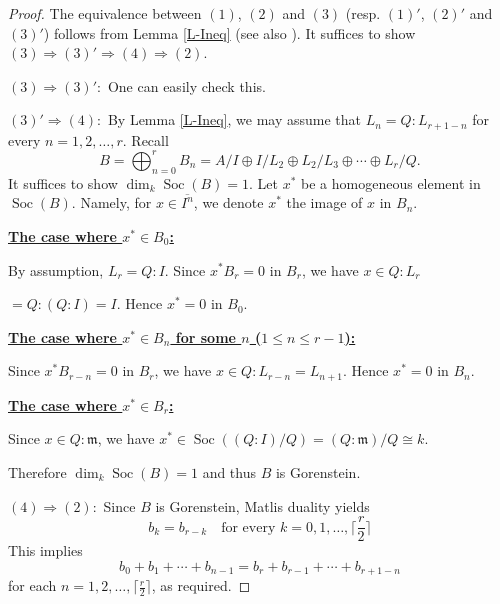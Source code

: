 \documentclass[12pt]{amsart}
\theoremstyle{definition}
\theoremstyle{remark}
\numberwithin{equation}{section}
\DeclareMathOperator{\Soc}{Soc}
\newcommand{\m}{\mathfrak m}
\renewcommand{\:}{\colon}
\begin{document}
\begin{proof}
The equivalence between $(1)$, $(2)$ and $(3)$ (resp. $(1)'$, $(2)'$ and $(3)'$) follows from Lemma \ref{L-Ineq} (see also \cite[Theorem 4.3]{HKU}).
It suffices to show $(3) \Rightarrow (3)' \Rightarrow (4)  \Rightarrow (2)$. 
  
\par \vspace{2mm} \par \noindent 
$(3) \Longrightarrow (3)':$ 
One can easily check this. 
\par \vspace{2mm} \par \noindent 
$(3)' \Longrightarrow (4):$ 
By Lemma \ref{L-Ineq}, we may assume that 
$L_n=Q:L_{r+1-n}$ for every $n=1,2,\ldots, r$.  
Recall 
\[
B=\bigoplus_{n=0}^r B_n=A/I\oplus I/L_2\oplus L_2/L_3 \oplus 
\cdots \oplus L_r/Q. 
\]
It suffices to show $\dim_k \Soc(B)=1$.  
Let $x^{*}$ be a homogeneous element  in $\Soc(B)$. 
Namely, for $x \in \overline{I^n}$, we denote $x^{*}$ 
the image of $x$ in $B_n$. 
\par \vspace{1mm} \par \noindent
\underline{\bf The case where $x^{*} \in B_0$:}
\par \vspace{1mm}
By assumption, $L_r=Q:I$. 
Since $x^{*} B_r =0$ in $B_r$, we have
$x \in Q \colon L_r$\par\noindent
$=Q \colon (Q:I)=I$. 
Hence $x^{*}=0$ in $B_0$. 
\par \vspace{1mm} \par \noindent
\underline{\bf The case where $x^{*} \in B_n$ 
for some $n$ ($1 \le n \le r-1$):}
\par \vspace{1mm}
Since $x^{*}B_{r-n}=0$ in $B_r$, we have 
$x \in Q \colon  L_{r-n}=L_{n+1}$. 
Hence $x^{*}=0$ in $B_n$. 
\par \vspace{1mm} \par \noindent
\underline{\bf The case where $x^{*} \in B_r$:}
\par \vspace{1mm}
Since $x \in Q:\m$, we have $x^{*} \in \Soc((Q:I)/Q) 
=(Q\colon \m)/Q\cong k$. 
\par \vspace{1mm}\par \noindent
Therefore $\dim_k \Soc(B)=1$ and thus $B$ is Gorenstein. 

\par \vspace{2mm} \par \noindent 
$(4) \Longrightarrow (2):$ 
Since $B$ is Gorenstein, Matlis duality yields 
\[
b_k = b_{r-k} \quad \text{for every $k=0,1,\ldots, \lceil \frac{r}{2} \rceil$}
\]
This implies 
\[
b_0+b_1+\cdots + b_{n-1} = b_r+b_{r-1}+\cdots + b_{r+1-n}
\]
for each $n=1,2, \ldots, \lceil \frac{r}{2} \rceil$, as required. 
\end{proof}
\end{document}
